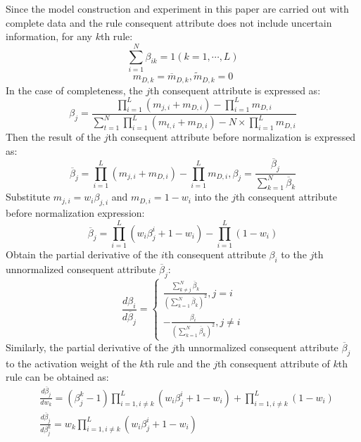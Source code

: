 \documentclass{ieeeaccess}
\begin{document}
Since the model construction and experiment in this paper are carried out with complete data and
the rule consequent attribute does not include uncertain information, for any $k$th rule:
\begin{equation}
    \sum_{i=1}^N\beta_{ik}=1(k=1,\cdots,L)
\end{equation}
\begin{equation}
    m_{D,k}=\overline{m}_{D,k},\widetilde{m}_{D,k}=0
\end{equation}
In the case of completeness, the $j$th consequent attribute is expressed as:
\begin{equation}
    \beta_j=\frac{\prod_{i=1}^L(m_{j,i}+m_{D,i})-\prod_{i=1}^Lm_{D,i}}{\sum_{t=1}^N\prod_{i=1}^L(m_{t,i}+m_{D,i})-N\times\prod_{i=1}^Lm_{D,i}}
\end{equation}
Then the result of the $j$th consequent attribute before normalization is expressed as:
\begin{equation}
    \overline{\beta}_j = \prod_{i=1}^L(m_{j,i}+m_{D,i})-\prod_{i=1}^Lm_{D,i},\beta_j=\frac{\overline{\beta}_j}{\sum_{k=1}^N\overline{\beta}_k}
\end{equation}
Substitute $m_{j,i}=w_i\beta_{j,i}$ and $m_{D,i}=1-w_i$ into the $j$th consequent attribute before normalization expression:
\begin{equation}
    \overline{\beta}_j = \prod_{i=1}^L(w_i\beta_j^i+1-w_i)-\prod_{i=1}^L{(1-w_i)}
\end{equation}
Obtain the partial derivative of the $i$th consequent attribute $\beta_i$ to the $j$th unnormalized consequent attribute $\overline{\beta}_j$:
\begin{equation}
    \frac{d\beta_i}{d\overline{\beta}_j}=
    \left\{
    \begin{aligned}
        \frac{\sum_{k\neq j}^N\overline{\beta}_k}{(\sum_{k=1}^N\overline{\beta}_k)^2},j=i \\
        -\frac{\beta_i}{(\sum_{k=1}^N\overline{\beta}_k)^2},j\neq i
    \end{aligned}
    \right.
\end{equation}
Similarly, the partial derivative of the $j$th unnormalized consequent attribute $\overline{\beta}_j$ to the activation weight of the $k$th rule and the $j$th consequent attribute of $k$th rule can be obtained as:
\begin{align}
     & \frac{d\overline{\beta}_j}{dw_k}=(\beta_j^k-1)\prod_{i=1,i\neq k}^L(w_i\beta_j^i+1-w_i)+\prod_{i=1,i\neq k}^L(1-w_i) \\
     & \frac{d\overline{\beta}_j}{d\beta_j^k}=w_k\prod_{i=1,i\neq k}^L(w_i\beta_j^i+1-w_i)
\end{align}
\end{document}
